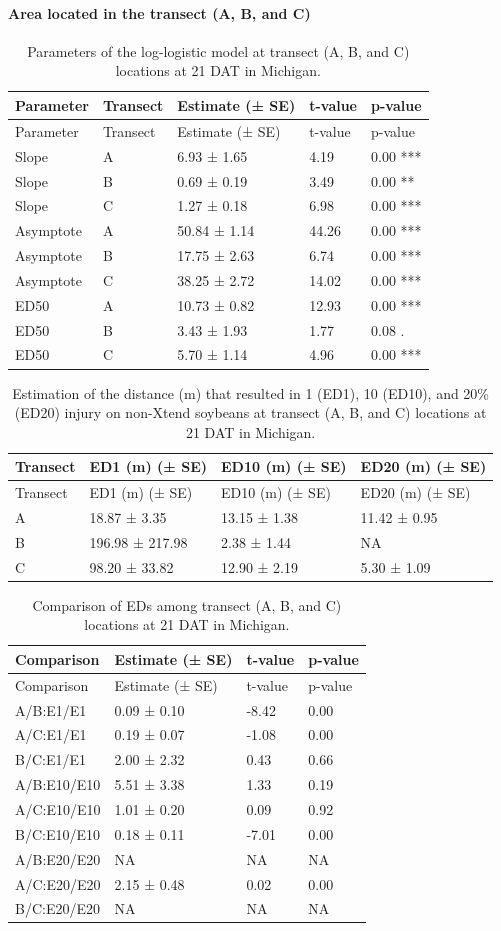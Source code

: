 \documentclass[]{article}
\let\oldparagraph\paragraph
\renewcommand{\paragraph}[1]{\oldparagraph{#1}\mbox{}}
\begin{document}
\newpage

\pagebreak

\paragraph{\texorpdfstring{Area located in the \textbf{transect} (A, B,
and
C)}{Area located in the transect (A, B, and C)}}\label{area-located-in-the-transect-a-b-and-c}

\begin{longtable}[]{@{}lllll@{}}
\caption{Parameters of the log-logistic model at transect (A, B, and C)
locations at 21 DAT in Michigan.}\tabularnewline
\toprule
Parameter & Transect & Estimate (± SE) & t-value &
p-value\tabularnewline
\midrule
\endfirsthead
\toprule
Parameter & Transect & Estimate (± SE) & t-value &
p-value\tabularnewline
\midrule
\endhead
Slope & A & 6.93 ± 1.65 & 4.19 & 0.00 ***\tabularnewline
Slope & B & 0.69 ± 0.19 & 3.49 & 0.00 **\tabularnewline
Slope & C & 1.27 ± 0.18 & 6.98 & 0.00 ***\tabularnewline
Asymptote & A & 50.84 ± 1.14 & 44.26 & 0.00 ***\tabularnewline
Asymptote & B & 17.75 ± 2.63 & 6.74 & 0.00 ***\tabularnewline
Asymptote & C & 38.25 ± 2.72 & 14.02 & 0.00 ***\tabularnewline
ED50 & A & 10.73 ± 0.82 & 12.93 & 0.00 ***\tabularnewline
ED50 & B & 3.43 ± 1.93 & 1.77 & 0.08 .\tabularnewline
ED50 & C & 5.70 ± 1.14 & 4.96 & 0.00 ***\tabularnewline
\bottomrule
\end{longtable}

\begin{longtable}[]{@{}llll@{}}
\caption{Estimation of the distance (m) that resulted in 1 (ED1), 10
(ED10), and 20\% (ED20) injury on non-Xtend soybeans at transect (A, B,
and C) locations at 21 DAT in Michigan.}\tabularnewline
\toprule
Transect & ED1 (m) (± SE) & ED10 (m) (± SE) & ED20 (m) (±
SE)\tabularnewline
\midrule
\endfirsthead
\toprule
Transect & ED1 (m) (± SE) & ED10 (m) (± SE) & ED20 (m) (±
SE)\tabularnewline
\midrule
\endhead
A & 18.87 ± 3.35 & 13.15 ± 1.38 & 11.42 ± 0.95\tabularnewline
B & 196.98 ± 217.98 & 2.38 ± 1.44 & NA\tabularnewline
C & 98.20 ± 33.82 & 12.90 ± 2.19 & 5.30 ± 1.09\tabularnewline
\bottomrule
\end{longtable}

\begin{longtable}[]{@{}llll@{}}
\caption{Comparison of EDs among transect (A, B, and C) locations at 21
DAT in Michigan.}\tabularnewline
\toprule
Comparison & Estimate (± SE) & t-value & p-value\tabularnewline
\midrule
\endfirsthead
\toprule
Comparison & Estimate (± SE) & t-value & p-value\tabularnewline
\midrule
\endhead
A/B:E1/E1 & 0.09 ± 0.10 & -8.42 & 0.00\tabularnewline
A/C:E1/E1 & 0.19 ± 0.07 & -1.08 & 0.00\tabularnewline
B/C:E1/E1 & 2.00 ± 2.32 & 0.43 & 0.66\tabularnewline
A/B:E10/E10 & 5.51 ± 3.38 & 1.33 & 0.19\tabularnewline
A/C:E10/E10 & 1.01 ± 0.20 & 0.09 & 0.92\tabularnewline
B/C:E10/E10 & 0.18 ± 0.11 & -7.01 & 0.00\tabularnewline
A/B:E20/E20 & NA & NA & NA\tabularnewline
A/C:E20/E20 & 2.15 ± 0.48 & 0.02 & 0.00\tabularnewline
B/C:E20/E20 & NA & NA & NA\tabularnewline
\bottomrule
\end{longtable}
\end{document}
